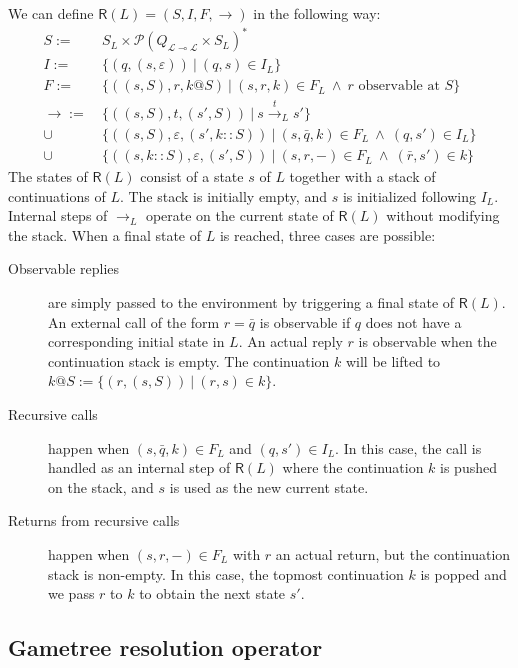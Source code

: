 \documentclass[11pt]{article}
\newcommand{\kw}[1]{{\mathsf{#1}}}
\begin{document}
We can define $\kw{R}(L) = (S, I, F, {\rightarrow})$ in the following way:
\begin{align*}
  S := &\: S_L \times \mathcal{P}(Q_{\mathcal{L} \multimap \mathcal{L}} \times S_L)^* \\
  I := &\: \{ (q, (s, \varepsilon)) \: \vert \: (q, s) \in I_L \} \\
  F := &\: \{ ((s, S), r, k@S) \: \vert \:
           (s, r, k) \in F_L \: \wedge \: r \mbox{ observable at } S \} \\
  {\rightarrow} := &\: \{ ((s, S), t, (s', S)) \: \vert \: s \stackrel{t}{\longrightarrow}_L s' \} \\
    \cup &\: \{ ((s, S), \varepsilon, (s', k::S)) \: \vert \:
        (s, \bar{q}, k) \in F_L \: \wedge \:
        (q, s') \in I_L \} \\
    \cup &\: \{ ((s, k::S), \varepsilon, (s', S)) \: \vert \:
        (s, r, -) \in F_L \: \wedge \:
        (\bar{r}, s') \in k \}
\end{align*}
The states of $\kw{R}(L)$
consist of a state $s$ of $L$ together with a stack of continuations of $L$.
The stack is initially empty,
and $s$ is initialized following $I_L$.
Internal steps of $\rightarrow_L$ operate on the current state of $\kw{R}(L)$
without modifying the stack.
When a final state of $L$ is reached, three cases are possible:
\begin{description}
\item[Observable replies] are simply passed to the environment
  by triggering a final state of $\kw{R}(L)$.
  An external call of the form $r = \bar{q}$ is observable
  if $q$ does not have a corresponding initial state in $L$.
  An actual reply $r$ is observable when the continuation stack is empty.
  The continuation $k$ will be lifted to
  $k@S := \{ (r, (s, S)) \: \vert \: (r, s) \in k \}$.
\item[Recursive calls] happen when
  $(s, \bar{q}, k) \in F_L$ and $(q, s') \in I_L$.
  In this case, the call is handled as an internal step of $\kw{R}(L)$
  where the continuation $k$ is pushed on the stack,
  and $s$ is used as the new current state.
\item[Returns from recursive calls] happen when $(s, r, -) \in F_L$
  with $r$ an actual return, but the continuation stack is non-empty.
  In this case, the topmost continuation $k$ is popped
  and we pass $r$ to $k$ to obtain the next state $s'$.
\end{description}

\subsection{Gametree resolution operator}
\end{document}
